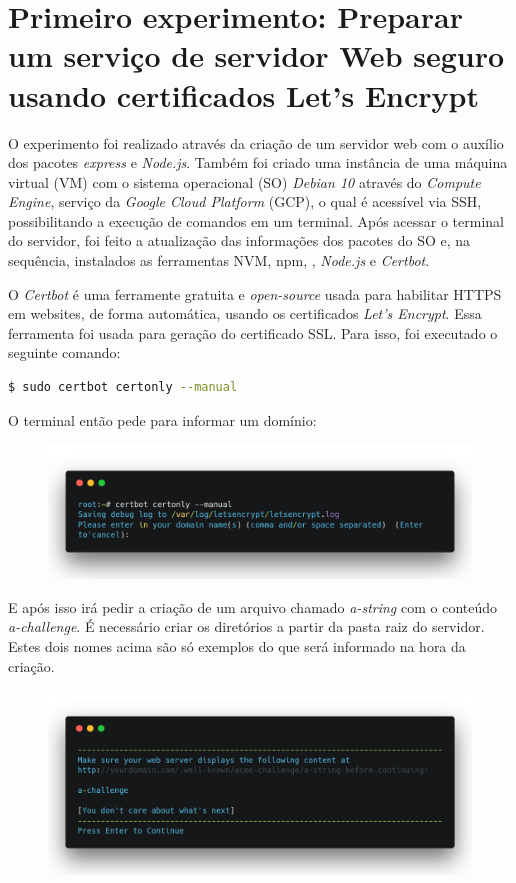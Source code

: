 \documentclass[
    openany,
    12pt,               %
    twoside,            %
    a4paper,            %
    english,            %
    brazil,             %
    ]{abntex2}
\begin{document}
\chapter{Primeiro experimento: Preparar um serviço de servidor Web seguro usando certificados Let's Encrypt}
\label{cap:primeiro-experimento}

O experimento foi realizado através da criação de um servidor web com o auxílio dos pacotes \textit{express} e \textit{Node.js}. Também foi criado uma instância de uma máquina virtual (VM) com o sistema operacional (SO) \textit{Debian 10} através do \textit{Compute Engine}, serviço da \textit{Google Cloud Platform} (GCP), o qual é acessível via SSH, possibilitando a execução de comandos em um terminal. Após acessar o terminal do servidor, foi feito a atualização das informações dos pacotes do SO e, na sequência, instalados as ferramentas NVM, npm, , \textit{Node.js} e \textit{Certbot}.

O \textit{Certbot} é uma ferramente gratuita e \textit{open-source} usada para habilitar HTTPS em websites, de forma automática, usando os certificados \textit{Let's Encrypt}. Essa ferramenta foi usada para geração do certificado SSL. Para isso, foi executado o seguinte comando:
\begin{lstlisting}[language=bash]
  $ sudo certbot certonly --manual
\end{lstlisting}

O terminal então pede para informar um domínio:

\begin{figure}[H]
\centering
\includegraphics[width=13.5cm]{domain.png}
\end{figure}

E após isso irá pedir a criação de um arquivo chamado \textit{a-string} com o conteúdo \textit{a-challenge}. É necessário criar os diretórios a partir da pasta raiz do servidor. Estes dois nomes acima são só exemplos do que será informado na hora da criação.
\begin{figure}[H]
\centering
\includegraphics[width=13.5cm]{verify.png}
\end{figure}
\end{document}
